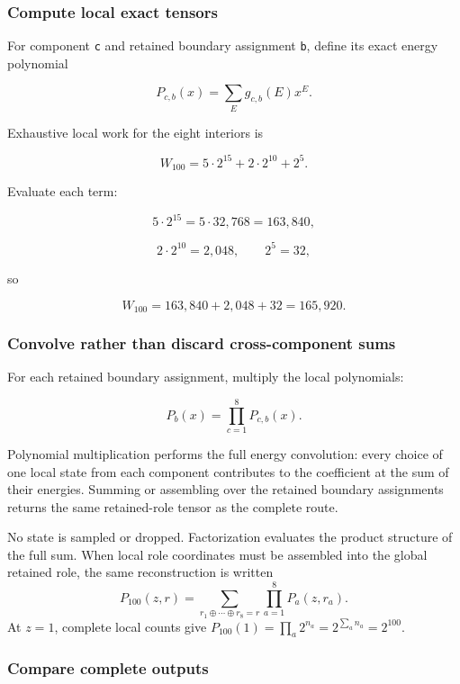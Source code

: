 \subsubsection{Compute local exact
tensors}\label{viii-ch01-compute-local-exact-tensors}

For component \texttt{c} and retained boundary assignment \texttt{b},
define its exact energy polynomial

\[
P_{c,b}(x)=\sum_E g_{c,b}(E)x^E.
\]

Exhaustive local work for the eight interiors is

\[
W_{100}
=5\cdot2^{15}+2\cdot2^{10}+2^5.
\]

Evaluate each term:

\[
5\cdot2^{15}=5\cdot32{,}768=163{,}840,
\]

\[
2\cdot2^{10}=2{,}048,
\qquad2^5=32,
\]

so

\[
W_{100}=163{,}840+2{,}048+32=165{,}920.
\]

\subsubsection{Convolve rather than discard cross-component
sums}\label{viii-ch01-convolve-rather-than-discard-cross-component-sums}

For each retained boundary assignment, multiply the local polynomials:

\[
P_b(x)=\prod_{c=1}^{8}P_{c,b}(x).
\]

Polynomial multiplication performs the full energy convolution: every
choice of one local state from each component contributes to the
coefficient at the sum of their energies. Summing or assembling over the
retained boundary assignments returns the same retained-role tensor as
the complete route.

No state is sampled or dropped. Factorization evaluates the product structure of the full sum. When local role coordinates must be assembled into the global retained role, the same reconstruction is written
\[
P_{100}(z,r)=\sum_{r_1\oplus\cdots\oplus r_8=r}\prod_{a=1}^{8}P_a(z,r_a).
\]
At $z=1$, complete local counts give $P_{100}(1)=\prod_a2^{n_a}=2^{\sum_an_a}=2^{100}$.

\subsubsection{Compare complete outputs}\label{viii-ch01-compare-complete-outputs}

